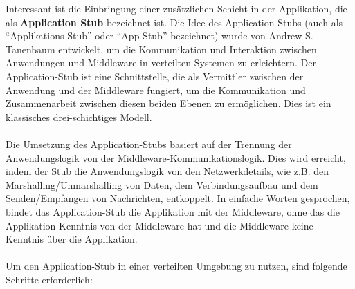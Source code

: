 \documentclass[../vs-script-first-v01.tex]{subfiles}
\begin{document}
Interessant ist die Einbringung einer zusätzlichen Schicht in der Applikation, die als \textbf{Application Stub} bezeichnet ist. Die Idee des Application-Stubs (auch als \enquote{Applikations-Stub} oder \enquote{App-Stub} bezeichnet) wurde von Andrew S. Tanenbaum entwickelt, um die Kommunikation und Interaktion zwischen Anwendungen und Middleware in verteilten Systemen zu erleichtern. Der Application-Stub ist eine Schnittstelle, die als Vermittler zwischen der Anwendung und der Middleware fungiert, um die Kommunikation und Zusammenarbeit zwischen diesen beiden Ebenen zu ermöglichen. Dies ist ein klassisches drei-schichtiges Modell.
\\\\
Die Umsetzung des Application-Stubs basiert auf der Trennung der Anwendungslogik von der Middleware-Kommunikationslogik. Dies wird erreicht, indem der Stub die Anwendungslogik von den Netzwerkdetails, wie z.B. den Marshalling/Unmarshalling von Daten, dem Verbindungsaufbau und dem Senden/Empfangen von Nachrichten, entkoppelt.
In einfache Worten gesprochen, bindet das Application-Stub die Applikation mit der Middleware, ohne das die Applikation Kenntnis von der Middleware hat und die Middleware keine Kenntnis über die Applikation.
\\\\
Um den Application-Stub in einer verteilten Umgebung zu nutzen, sind folgende Schritte erforderlich:
\end{document}

